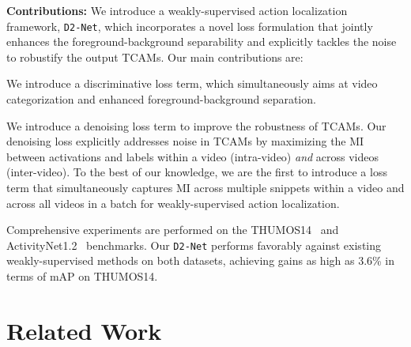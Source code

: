 \documentclass[final]{cvpr}
\def\proposed{\texttt{D2-Net}{}}
\begin{document}
\noindent\textbf{Contributions:} We introduce a weakly-supervised action localization framework, \proposed{}, which incorporates a novel loss formulation that jointly enhances the foreground-background separability and explicitly tackles the noise to robustify the output TCAMs. 
Our main contributions are: 
\begin{compactitem}
\item We introduce a discriminative loss term, which simultaneously aims at video categorization and enhanced foreground-background separation.

\item We introduce a denoising loss term to improve the robustness of TCAMs. Our denoising loss explicitly addresses noise in TCAMs by maximizing the MI between activations and labels within a video (intra-video) \textit{and} across videos (inter-video).  To the best of our knowledge, we are the first to introduce a loss term that simultaneously captures MI across multiple snippets within a video and across all videos in a batch for weakly-supervised action localization.



\item Comprehensive experiments are performed on the THUMOS14~\cite{thumos14} and ActivityNet1.2~\cite{activitynet} benchmarks. Our \proposed{} performs favorably against existing weakly-supervised methods on both datasets, achieving gains as high as 3.6\% in terms of mAP on THUMOS14. 

\end{compactitem}








\section{Related Work}
\end{document}
